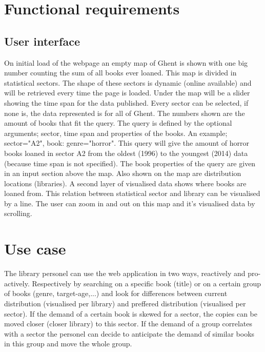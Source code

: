 \section{Functional requirements}

\subsection{User interface}

On initial load of the webpage an empty map of Ghent is shown with one big number counting the sum of all books ever loaned. This map is divided in statistical sectors. The shape of these sectors is dynamic (online available) and will be retrieved every time the page is loaded. Under the map will be a slider showing the time span for the data published. Every sector can be selected, if none is, the data represented is for all of Ghent.  The numbers shown are the amount of books that fit the query. The query is defined by the optional arguments; sector, time span and properties of the books. An example; sector="A2", book: genre="horror". This query will give the amount of horror books loaned in sector A2 from the oldest (1996) to the youngest (2014) data (because time span is not specified). The book properties of the query are given in an input section above the map. Also shown on the map are distribution locations (libraries). A second layer of visualised data shows where books are loaned from. This relation between statistical sector and library can be visualised by a line. The user can zoom in and out on this map and it's visualised data by scrolling.

\section{Use case}

The library personel can use the web application in two ways, reactively and pro-actively. Respectively by searching on a specific book (title) or on a certain group of books (genre, target-age,...) and look for differences between current distribution (visualised per library) and preffered distribution (visualised per sector). If the demand of a certain book is skewed for a sector, the copies can be moved closer (closer library) to this sector. If the demand of a group correlates with a sector the personel can decide to anticipate the demand of similar books in this group and move the whole group.
